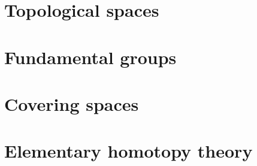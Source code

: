 \documentclass[11pt]{book} %
\begin{document}


\pagestyle{empty} %

\tableofcontents %

\cleardoublepage %

\pagestyle{fancy} %


\chapter{Topological spaces}
\chapter{Fundamental groups}
\chapter{Covering spaces}
\chapter{Elementary homotopy theory}
\end{document}
